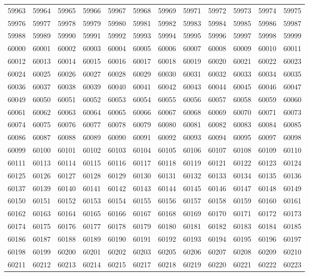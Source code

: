 \begin{center}
\begin{longtable}{llllllllllll}
59963 &59964 &59965 &59966 &59967 &59968 &59969 &59971 &59972 &59973 &59974 &59975 \\
59976 &59977 &59978 &59979 &59980 &59981 &59982 &59983 &59984 &59985 &59986 &59987 \\
59988 &59989 &59990 &59991 &59992 &59993 &59994 &59995 &59996 &59997 &59998 &59999 \\
60000 &60001 &60002 &60003 &60004 &60005 &60006 &60007 &60008 &60009 &60010 &60011 \\
60012 &60013 &60014 &60015 &60016 &60017 &60018 &60019 &60020 &60021 &60022 &60023 \\
60024 &60025 &60026 &60027 &60028 &60029 &60030 &60031 &60032 &60033 &60034 &60035 \\
60036 &60037 &60038 &60039 &60040 &60041 &60042 &60043 &60044 &60045 &60046 &60047 \\
60049 &60050 &60051 &60052 &60053 &60054 &60055 &60056 &60057 &60058 &60059 &60060 \\
60061 &60062 &60063 &60064 &60065 &60066 &60067 &60068 &60069 &60070 &60071 &60073 \\
60074 &60075 &60076 &60077 &60078 &60079 &60080 &60081 &60082 &60083 &60084 &60085 \\
60086 &60087 &60088 &60089 &60090 &60091 &60092 &60093 &60094 &60095 &60097 &60098 \\
60099 &60100 &60101 &60102 &60103 &60104 &60105 &60106 &60107 &60108 &60109 &60110 \\
60111 &60113 &60114 &60115 &60116 &60117 &60118 &60119 &60121 &60122 &60123 &60124 \\
60125 &60126 &60127 &60128 &60129 &60130 &60131 &60132 &60133 &60134 &60135 &60136 \\
60137 &60139 &60140 &60141 &60142 &60143 &60144 &60145 &60146 &60147 &60148 &60149 \\
60150 &60151 &60152 &60153 &60154 &60155 &60156 &60157 &60158 &60159 &60160 &60161 \\
60162 &60163 &60164 &60165 &60166 &60167 &60168 &60169 &60170 &60171 &60172 &60173 \\
60174 &60175 &60176 &60177 &60178 &60179 &60180 &60181 &60182 &60183 &60184 &60185 \\
60186 &60187 &60188 &60189 &60190 &60191 &60192 &60193 &60194 &60195 &60196 &60197 \\
60198 &60199 &60200 &60201 &60202 &60203 &60205 &60206 &60207 &60208 &60209 &60210 \\
60211 &60212 &60213 &60214 &60215 &60217 &60218 &60219 &60220 &60221 &60222 &60223 \\

\end{longtable}
\end{center}
